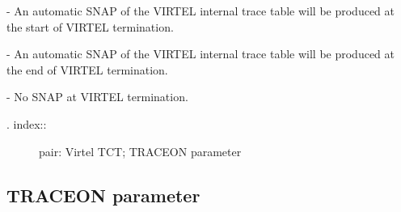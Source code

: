 \documentclass[letterpaper,10pt,english]{sphinxmanual}
\begin{document}
 - An automatic SNAP of the VIRTEL internal trace table will be produced at the start of VIRTEL termination.

 - An automatic SNAP of the VIRTEL internal trace table will be produced at the end of VIRTEL termination.

 - No SNAP at VIRTEL termination.
\begin{description}
\item[{. index::}] \leavevmode
pair: Virtel TCT; TRACEON parameter

\end{description}


\subsection{TRACEON parameter}
\label{\detokenize{Installation_Guide:traceon-parameter}}
\end{document}
